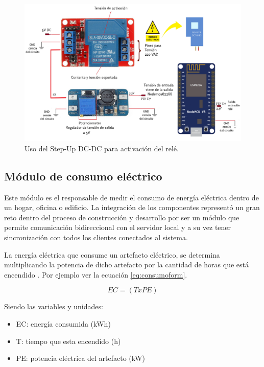 \begin{figure}[htpb]
\centering 
\includegraphics[width=1.057\textwidth]{./Figures/esquemaactuador.png}
\caption{Uso del Step-Up DC-DC para activación del relé. }
\label{fig:esquemaactuador}
\end{figure}


\subsection{Módulo de consumo eléctrico}

Este módulo es el responsable de medir el consumo de energía eléctrica dentro de un hogar, oficina o edificio. La integración de los componentes representó un gran reto dentro del proceso de construcción y desarrollo por ser un módulo que permite comunicación bidireccional con el servidor local y a su vez tener sincronización con todos los clientes conectados al sistema.



La energía eléctrica que consume un artefacto eléctrico, se determina multiplicando la potencia de dicho artefacto por la cantidad de horas que está encendido \citep{BOOK:3}. Por ejemplo ver la ecuación \ref{eq:consumoform}.

\begin{equation}
	\label{eq:consumoform}
	EC = \left( T x PE \right)
\end{equation}

\vspace{0.1cm}
Siendo las variables y unidades:
\begin{itemize}
\item EC: energía consumida (kWh)
\item T: tiempo que esta encendido (h)
\item PE: potencia eléctrica del artefacto (kW)
\end{itemize}

